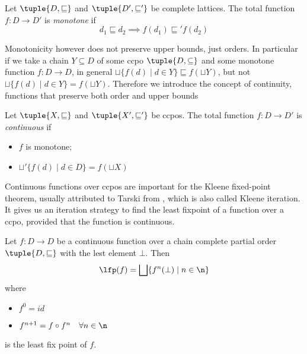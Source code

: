 \begin{definition}
  Let \(\tuple{D, \sqsubseteq}\) and \(\tuple{D', \sqsubseteq'}\) be
  complete lattices. The total function \(f : D \to D'\) is
  \emph{monotone} if
  \begin{equation*}
    d_1 \sqsubseteq d_2 \implies f(d_1) \sqsubseteq' f(d_2)
  \end{equation*}
\end{definition}


Monotonicity however does not preserve upper bounds, just orders. In
particular if we take a chain \(Y \subseteq D\) of some ccpo
\(\tuple{D, \subseteq}\) and some monotone function \(f : D \to D\),
in general \(\sqcup\{f(d) \mid d \in Y\} \sqsubseteq f(\sqcup Y)\),
but not \(\sqcup\{f(d) \mid d \in Y\} = f(\sqcup Y)\). Therefore we
introduce the concept of continuity, functions that preserve both
order and upper bounds

\begin{definition}
  Let \(\tuple{X, \sqsubseteq}\) and \(\tuple{X', \sqsubseteq'}\) be
  ccpos. The total function \(f : D \to D'\) is \emph{continuous} if
  \begin{itemize}
  \item \(f\) is monotone;
  \item \(\sqcup'\{f(d) \mid d \in D\} = f(\sqcup X)\)
  \end{itemize}
\end{definition}

Continuous functions over ccpos are important for the Kleene
fixed-point theorem, usually attributed to Tarski from
\cite{tarski1955lattice}, which is also called Kleene iteration. It
gives us an iteration strategy to find the least fixpoint of a
function over a ccpo, provided that the function is continuous.

\begin{theorem}\label{th:fixpoint}
  Let \(f : D \to D\) be a continuous function over a chain complete
  partial order \(\tuple{D , \sqsubseteq}\) with the lest element
  \(\bot\). Then
  \begin{equation*}
    \lfp(f) = \bigsqcup\{f^n(\bot) \mid n \in \n\}
  \end{equation*}
  where
  \begin{itemize}
  \item \(f^0 = id\)
  \item \(f^{n+1} = f \circ f^n \quad \forall n \in \n\)
  \end{itemize}
  is the least fix point of \(f\).
\end{theorem}
